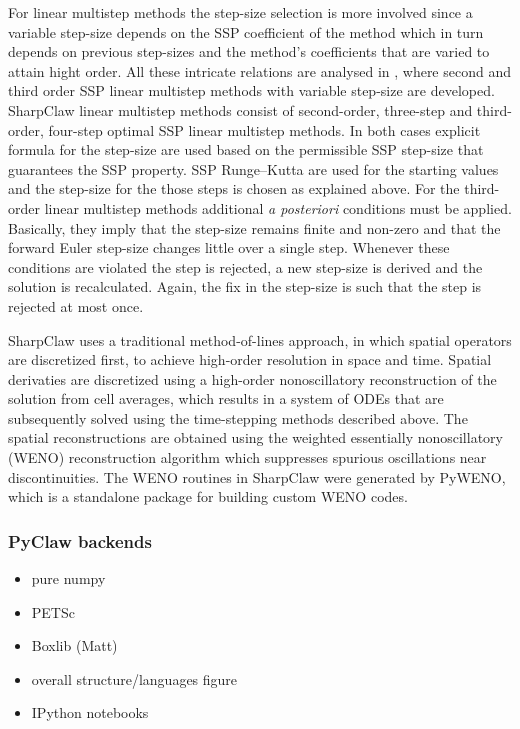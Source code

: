 For linear multistep methods the step-size selection is more involved since a variable step-size depends on
the SSP coefficient of the method which in turn depends on previous step-sizes and the method's coefficients 
that are varied to attain hight order. 
All these intricate relations are analysed in , where second and third order SSP linear
multistep methods with variable step-size are developed.
SharpClaw linear multistep methods consist of second-order, three-step and third-order, four-step optimal 
SSP linear multistep methods.
In both cases explicit formula for the step-size are used based on the permissible SSP step-size that 
guarantees the SSP property.
SSP Runge--Kutta are used for the starting values and the step-size for the those steps is chosen as
explained above.
For the third-order linear multistep methods additional {\em a posteriori} conditions must be applied.
Basically, they imply that the step-size remains finite and non-zero and that the forward Euler step-size
changes little over a single step.
Whenever these conditions are violated the step is rejected, a new step-size is derived and the solution is
recalculated.
Again, the fix in the step-size is such that the step is rejected at most once.

SharpClaw uses a traditional method-of-lines approach, in which
spatial operators are discretized first, to achieve high-order
resolution in space and time.  Spatial derivaties are discretized
using a high-order nonoscillatory reconstruction of the solution from
cell averages, which results in a system of ODEs that are subsequently
solved using the time-stepping methods described above.  The spatial
reconstructions are obtained using the weighted essentially
nonoscillatory (WENO) reconstruction algorithm which suppresses
spurious oscillations near discontinuities.  The WENO routines in
SharpClaw were generated by PyWENO, which is a standalone package for
building custom WENO codes. \cite{ketcheson2012pyclaw} 


\subsubsection{PyClaw backends}
\begin{itemize}
    \item pure numpy
    \item PETSc
    \item Boxlib (Matt)
\end{itemize}

\begin{itemize}
    \item overall structure/languages figure
    \item IPython notebooks
\end{itemize}
